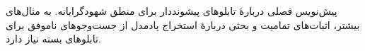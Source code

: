 \documentclass[../../../include/open-logic-chapter]{subfiles}
\begin{document}

\begin{editorial}
  پیش‌نویس فصلی دربارهٔ تابلوهای پیشونددار برای منطق شهودگرایانه. به
  مثال‌های بیشتر، اثبات‌های تمامیت و بحثی دربارهٔ استخراج پادمدل از
  جست‌وجوهای ناموفق برای تابلوهای بسته نیاز دارد.
\end{editorial}


\OLEndChapterHook
\end{document}
